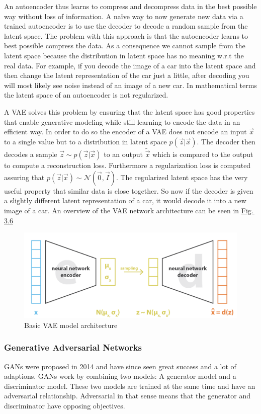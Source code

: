 An autoencoder thus learns to compress and decompress data in the best possible way without loss of information. A na\"{i}ve way to now generate new data via a trained autoencoder is to use the decoder to decode a random sample from the latent space. The problem with this approach is that the autoencoder learns to best possible compress the data. As a consequence we cannot sample from the latent space because the distribution in latent space has no meaning w.r.t the real data. For example, if you decode the image of a car into the latent space and then change the latent representation of the car just a little, after decoding you will most likely see noise instead of an image of a new car. In mathematical terms the latent space of an autoencoder is not regularized.

A VAE solves this problem by ensuring that the latent space has good properties that enable generative modeling while still learning to encode the data in an efficient way. In order to do so the encoder of a VAE does not encode an input $\vec{x}$ to a single value but to a distribution in latent space $p(\vec{z}|\vec{x})$. The decoder then decodes a sample $\vec{z}\sim p(\vec{z}|\vec{x})$ to an output $\tilde{\vec{x}}$ which is compared to the output to compute a reconstruction loss. Furthermore a regularization loss is computed assuring that $p(\vec{z}|\vec{x})\sim\mathcal{N}(\vec{0},\vec{I})$. The regularized latent space has the very useful property that similar data is close together. So now if the decoder is given a slightly different latent representation of a car, it would decode it into a new image of a car. An overview of the VAE network architecture can be seen in \hyperref[fig:3.6]{Fig.\,3.6}
%
\begin{figure} \label{fig:3.6}
    \centering
    \includegraphics[width=.65\textwidth]{Chapters/figures/vae.PNG}
    \caption{Basic VAE model architecture}
\end{figure}
%
\subsubsection{Generative Adversarial Networks} \label{equ:3.3}
GANs were proposed in 2014 \cite{gan_original} and have since seen great success and a lot of adaptions. GANs work by combining two models: A generator model and a discriminator model. These two models are trained at the same time and have an adversarial relationship. Adversarial in that sense means that the generator and discriminator have opposing objectives. 

